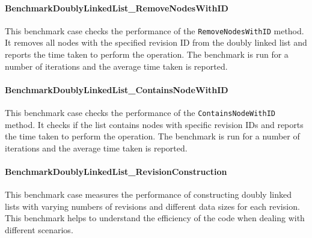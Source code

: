 \paragraph{BenchmarkDoublyLinkedList\_RemoveNodesWithID}
This benchmark case checks the performance of the \lstinline{RemoveNodesWithID} method. It removes all nodes with the specified revision ID from the doubly linked list and reports the time taken to perform the operation. The benchmark is run for a number of iterations and the average time taken is reported.

\paragraph{BenchmarkDoublyLinkedList\_ContainsNodeWithID}
This benchmark case checks the performance of the \lstinline{ContainsNodeWithID} method. It checks if the list contains nodes with specific revision IDs and reports the time taken to perform the operation. The benchmark is run for a number of iterations and the average time taken is reported.




\paragraph{BenchmarkDoublyLinkedList\_RevisionConstruction}
This benchmark case measures the performance of constructing doubly linked lists with varying numbers of revisions and different data sizes for each revision. This benchmark helps to understand the efficiency of the code when dealing with different scenarios.

